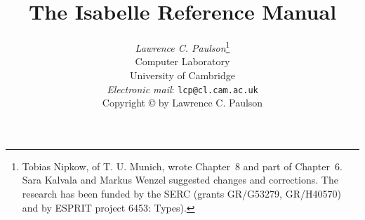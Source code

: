 \title{The Isabelle Reference Manual}

\author{{\em Lawrence C. Paulson}\thanks
{Tobias Nipkow, of T. U. Munich, wrote Chapter~8 and part of Chapter~6.
 Sara Kalvala and Markus Wenzel suggested changes and corrections.
 The research has been funded by the SERC (grants GR/G53279, GR/H40570)
  and by ESPRIT project 6453: Types).} 
\\  
        Computer Laboratory \\ University of Cambridge \\[2ex]
        {\small{\em Electronic mail\/}: {\tt lcp@cl.cam.ac.uk}} \\[3cm]
    {\small Copyright \copyright{} \number\year{} by Lawrence C. Paulson}
}
\date{} 
\makeindex

\underscoreoff

\setcounter{secnumdepth}{1} \setcounter{tocdepth}{2}

\pagestyle{headings}
\sloppy
\binperiod     %













 \small\raggedright\frenchspacing




